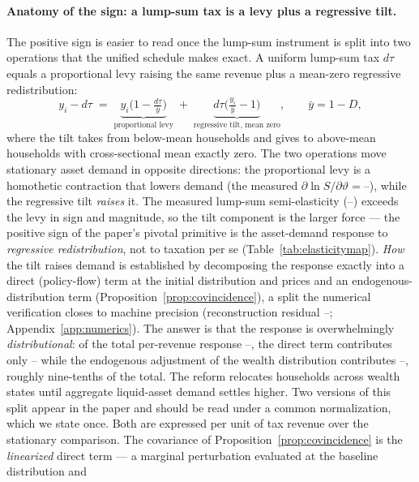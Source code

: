 \documentclass[12pt]{article}
\providecommand{\pendingnum}{\textit{--}}
\providecommand{\epsTau}{\pendingnum}\providecommand{\epsLevy}{\pendingnum}
\providecommand{\epsTilt}{\pendingnum}
\providecommand{\covPolExact}{\pendingnum}\providecommand{\covDistExact}{\pendingnum}
\providecommand{\covReconResid}{\pendingnum}
\newcommand{\Sfun}{S}
\begin{document}
\paragraph{Anatomy of the sign: a lump-sum tax is a levy plus a regressive
tilt.} The positive sign is easier to read once the lump-sum instrument is
split into two operations that the unified schedule makes exact. A uniform
lump-sum tax $d\tau$ equals a proportional levy raising the same revenue
plus a mean-zero regressive redistribution:
\begin{equation}
y_i - d\tau
\;=\; \underbrace{y_i\Big(1-\tfrac{d\tau}{\bar y}\Big)}_{\text{proportional levy}}
\;+\; \underbrace{d\tau\big(\tfrac{y_i}{\bar y}-1\big)}_{\text{regressive tilt, mean zero}},
\qquad \bar y = 1-D,
\label{eq:tiltdecomp}
\end{equation}
where the tilt takes from below-mean households and gives to above-mean
households with cross-sectional mean exactly zero. The two operations move
stationary asset demand in opposite directions: the proportional
levy is a homothetic contraction that lowers demand (the measured
$\partial\ln\Sfun/\partial\vartheta=\epsLevy$), while the regressive tilt
\emph{raises} it. The measured lump-sum semi-elasticity ($\epsTau$) exceeds
the levy in sign and magnitude, so the tilt component is the larger force
--- the positive sign of the paper's pivotal primitive is the asset-demand
response to \emph{regressive redistribution}, not to taxation per se
(Table~\ref{tab:elasticitymap}). \emph{How} the tilt raises demand is
established by decomposing the response exactly into a direct
(policy-flow) term at the initial distribution and prices and an
endogenous-distribution term (Proposition~\ref{prop:covincidence}), a split
the numerical verification closes to machine precision (reconstruction residual
$\covReconResid$; Appendix~\ref{app:numerics}). The answer is that the
response is overwhelmingly \emph{distributional}: of the total per-revenue
response $\epsTilt$, the direct term contributes only $\covPolExact$ while
the endogenous adjustment of the wealth distribution contributes
$\covDistExact$, roughly nine-tenths of the total. The reform relocates
households across wealth states until aggregate liquid-asset demand settles
higher. Two versions of this split appear in the paper and should be read
under a common normalization, which we state once. Both are expressed per
unit of tax revenue over the stationary comparison. The covariance of
Proposition~\ref{prop:covincidence} is the \emph{linearized} direct term
--- a marginal perturbation evaluated at the baseline distribution and
\end{document}

